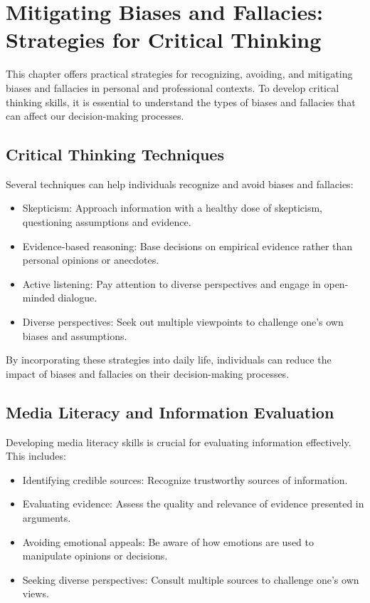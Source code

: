 \documentclass{report}%
\begin{document}
{{{{{{{{{{{%
\chapter{Mitigating Biases and Fallacies: Strategies for Critical Thinking}

This chapter offers practical strategies for recognizing, avoiding, and mitigating biases and fallacies in personal and professional contexts. To develop critical thinking skills, it is essential to understand the types of biases and fallacies that can affect our decision-making processes.

\section{Critical Thinking Techniques}

Several techniques can help individuals recognize and avoid biases and fallacies:

\begin{itemize}
    \item Skepticism: Approach information with a healthy dose of skepticism, questioning assumptions and evidence.
    \item Evidence-based reasoning: Base decisions on empirical evidence rather than personal opinions or anecdotes.
    \item Active listening: Pay attention to diverse perspectives and engage in open-minded dialogue.
    \item Diverse perspectives: Seek out multiple viewpoints to challenge one's own biases and assumptions.
\end{itemize}

By incorporating these strategies into daily life, individuals can reduce the impact of biases and fallacies on their decision-making processes.

\section{Media Literacy and Information Evaluation}

Developing media literacy skills is crucial for evaluating information effectively. This includes:

\begin{itemize}
    \item Identifying credible sources: Recognize trustworthy sources of information.
    \item Evaluating evidence: Assess the quality and relevance of evidence presented in arguments.
    \item Avoiding emotional appeals: Be aware of how emotions are used to manipulate opinions or decisions.
    \item Seeking diverse perspectives: Consult multiple sources to challenge one's own views.
\end{itemize}

}}}}}}}}}}}
\end{document}
